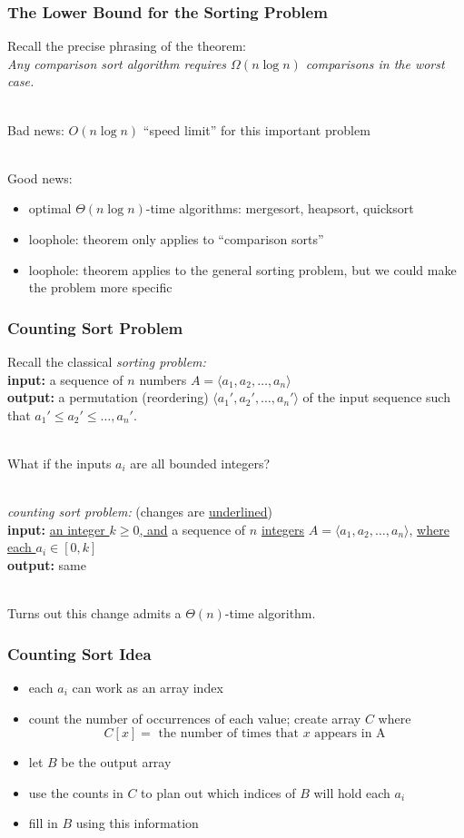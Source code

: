 \documentclass[10pt,aspectratio=169]{beamer}
\newcommand{\stanza}{ \\~\ }
\begin{document}
\begin{frame} \frametitle{The Lower Bound for the Sorting Problem}

Recall the precise phrasing of the theorem: \\
\emph{Any comparison sort algorithm requires $\Omega(n \log n)$ comparisons
 in the worst case.} \stanza

Bad news: $O(n \log n)$ ``speed limit'' for this important problem \stanza

Good news:
\begin{itemize}
  \item optimal $\Theta(n \log n)$-time algorithms: mergesort, heapsort, quicksort
  \item loophole: theorem only applies to ``comparison sorts''
  \item loophole: theorem applies to the general sorting problem, but we could
    make the problem more specific
\end{itemize}
\end{frame}

\begin{frame} \frametitle{Counting Sort Problem}
Recall the classical \emph{sorting problem:} \\
\textbf{input:} a sequence of $n$ numbers $A=\langle a_1, a_2, \ldots, a_n \rangle$ \\
\textbf{output:} a permutation (reordering) $\langle a_1', a_2', \ldots, a_n' \rangle$
  of the input sequence such that $a_1' \leq a_2' \leq \ldots, a_n'.$ \stanza

What if the inputs $a_i$ are all bounded integers? \stanza

\emph{counting sort problem:} (changes are \underline{underlined}) \\
\textbf{input:} \underline{an integer $k \geq 0$, and}
  a sequence of $n$ \underline{integers} $A=\langle a_1, a_2, \ldots, a_n \rangle$,
  \underline{where each $a_i \in [0, k]$} \\
\textbf{output:} same \stanza

Turns out this change admits a $\Theta(n)$-time algorithm.
\end{frame}

\begin{frame} \frametitle{Counting Sort Idea}
\begin{itemize}
  \item each $a_i$ can work as an array index
  \item count the number of occurrences of each value; create array $C$ where
    \[ C[x] = \text{ the number of times that } x \text{ appears in A } \]
  \item let $B$ be the output array
  \item use the counts in $C$ to plan out which indices of $B$ will hold each $a_i$
  \item fill in $B$ using this information
\end{itemize}
\end{frame}
\end{document}
